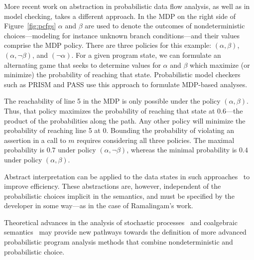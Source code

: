 More recent work on abstraction in probabilistic data flow
analysis, as well as in model checking, takes a different approach.
In the MDP on the right side of Figure~\ref{fig:pcfgs} $\alpha$ and
$\beta$ are used to denote the outcomes of nondeterministic
choices---modeling for instance unknown branch conditions---and their
values comprise the MDP policy.
There are three policies for this example:
$(\alpha,\beta)$, $(\alpha,\neg \beta)$, and $(\neg \alpha)$.
For a given program state, we can formulate an alternating game
that seeks to determine values for $\alpha$ and $\beta$ which 
maximize (or minimize) the probability of reaching that state.
Probabilistic model checkers such as PRISM and PASS 
use this approach to formulate MDP-based analyses.

The reachability of line 5 in the MDP is only possible under
the policy $(\alpha, \beta)$.  Thus, that policy maximizes the
probability of reaching that state at $0.6$---the product of 
the probabilities along the path. 
Any other policy will minimize the probability of reaching
line 5 at $0$.
Bounding the probability of violating an assertion in a call to $m$ 
requires considering all three policies.  The
maximal probability is $0.7$ under policy $(\alpha, \neg \beta)$,
whereas the minimal probability is 
$0.4$ under policy $(\alpha, \beta)$.

Abstract interpretation can be applied to the data states in
such approaches~\cite{kwiatkowska2011prism,wachter2010best,esparza2011probabilistic}
to improve efficiency.  These abstractions are, however,
independent of the probabilistic choices implicit in the semantics, and must be specified
by the developer in some way---as in the case of Ramalingam's work.

Theoretical advances in the analysis of stochastic 
processes~\cite{Pugelli:CAV2013} and coalgebraic 
semantics~\cite{HASUO200647,Oliveira2016449}
may provide new pathways towards the definition of more advanced 
probabilistic program analysis methods that combine nondeterministic 
and probabilistic choice.
